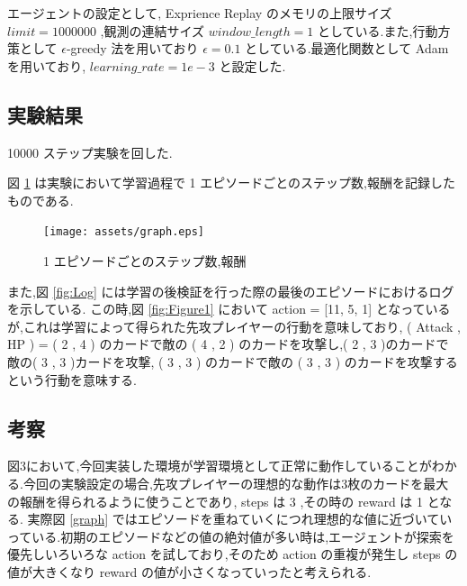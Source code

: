\documentclass{jarticle}     %
\begin{document}
エージェントの設定として, Exprience Replay のメモリの上限サイズ $limit = 1000000$ ,観測の連結サイズ $window\_length=1$ としている.また,行動方策として $\epsilon$-greedy 法を用いており $\epsilon = 0.1$ としている.最適化関数として Adam を用いており, $learning\_rate = 1e-3$ と設定した.

\subsection{実験結果}
10000 ステップ実験を回した.

図 \ref{fig:graph} は実験において学習過程で 1 エピソードごとのステップ数,報酬を記録したものである.

\begin{figure}[htbp]
  \centering
  \texttt{[image: assets/graph.eps]}
  \caption{ 1 エピソードごとのステップ数,報酬}
  \label{fig:graph}
\end{figure}

また,図 \ref{fig:Log} には学習の後検証を行った際の最後のエピソードにおけるログを示している.
この時,図 \ref{fig:Figure1} において action = [11, 5, 1] となっているが,これは学習によって得られた先攻プレイヤーの行動を意味しており,
 ( Attack , HP ) = ( 2 , 4 ) のカードで敵の ( 4 , 2 ) のカードを攻撃し,( 2 , 3 )のカードで敵の( 3 , 3 )カードを攻撃, ( 3 , 3 ) のカードで敵の ( 3 , 3 ) のカードを攻撃するという行動を意味する.

\subsection{考察}
図3において,今回実装した環境が学習環境として正常に動作していることがわかる.今回の実験設定の場合,先攻プレイヤーの理想的な動作は3枚のカードを最大の報酬を得られるように使うことであり, steps は 3 ,その時の reward は 1 となる.
実際図 \ref{graph} ではエピソードを重ねていくにつれ理想的な値に近づいていっている.初期のエピソードなどの値の絶対値が多い時は,エージェントが探索を優先しいろいろな action を試しており,そのため action の重複が発生し steps の値が大きくなり reward の値が小さくなっていったと考えられる.
\end{document}
